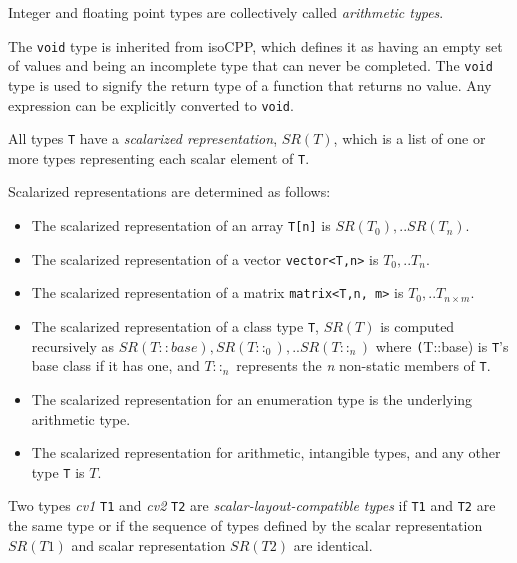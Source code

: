 \p Integer and floating point types are collectively called \textit{arithmetic
types}.

\p The \texttt{void} type is inherited from \gls{isoCPP}, which defines it as
having an empty set of values and being an incomplete type that can never be
completed. The \texttt{void} type is used to signify the return type of a
function that returns no value. Any expression can be explicitly converted to
\texttt{void}.


\p All types \texttt{T} have a \textit{scalarized representation}, \(SR(T)\),
which is a list of one or more types representing each scalar element of
\texttt{T}.

\p Scalarized representations are determined as follows:
\begin{itemize}
\item The scalarized representation of an array \texttt{T[n]} is \(SR(T_0), ..
SR(T_n)\).

\item The scalarized representation of a vector \texttt{vector<T,n>} is \(T_0,
.. T_n\).

\item The scalarized representation of a matrix \texttt{matrix<T,n, m>} is
\(T_0, .. T_{n \times m}\).

\item The scalarized representation of a class type \texttt{T}, \(SR(T)\) is
computed recursively as \(SR(T::base), SR(T::_0), .. SR(T::_n)\) where
\texttt(T::base) is \texttt{T}'s base class if it has one, and \(T::_n\)
represents the \textit{n} non-static members of \texttt{T}.

\item The scalarized representation for an enumeration type is the underlying
arithmetic type.

\item The scalarized representation for arithmetic, intangible types, and any other
type \texttt{T} is \(T\).
\end{itemize}

\p Two types \textit{cv1} \texttt{T1} and \textit{cv2} \texttt{T2} are
\textit{scalar-layout-compatible types} if \texttt{T1} and \texttt{T2} are the same
type or if the sequence of types defined by the scalar representation \(SR(T1)\)
and scalar representation \(SR(T2)\) are identical.


